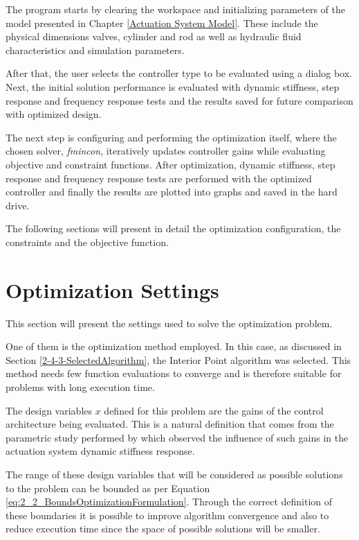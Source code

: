 The program starts by clearing the workspace and initializing parameters of the model presented in Chapter \ref{Actuation System Model}. These include the physical dimensions valves, cylinder and rod as well as hydraulic fluid characteristics and simulation parameters.

After that, the user selects the controller type to be evaluated using a dialog box. Next, the initial solution performance is evaluated with dynamic stiffness, step response and frequency response tests and the results saved for future comparison with optimized design.

The next step is configuring and performing the optimization itself, where the chosen solver, \textit{fmincon}, iteratively updates controller gains while evaluating objective and constraint functions. After optimization, dynamic stiffness, step response and frequency response tests are performed with the optimized controller and finally the results are plotted into graphs and saved in the hard drive.

The following sections will present in detail the optimization configuration, the constraints and the objective function.

\section{Optimization Settings} \label{4-2-OptimizationParameters}

This section will present the settings used to solve the optimization problem. 

One of them is the optimization method employed. In this case, as discussed in Section \ref{2-4-3-SelectedAlgorithm}, the Interior Point algorithm was selected. This method needs few function evaluations to converge and is therefore suitable for problems with long execution time.

The design variables $x$ defined for this problem are the gains of the control architecture being evaluated. This is a natural definition that comes from the parametric study performed by  which observed the influence of such gains in the actuation system dynamic stiffness response. 

The range of these design variables that will be considered as possible solutions to the problem can be bounded as per Equation \ref{eq:2_2_BoundsOptimizationFormulation}. Through the correct definition of these boundaries it is possible to improve algorithm convergence and also to reduce execution time since the space of possible solutions will be smaller.

